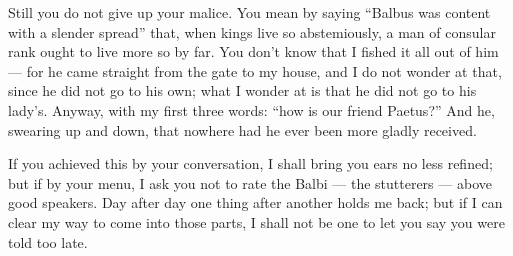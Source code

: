 

 Still you do not give up your malice. You mean by saying ``Balbus was content with a slender spread'' that, when kings live so abstemiously, a man of consular rank ought to live more so by far. You don't know that I fished it all out of him --- for he came straight from the gate to my house, and I do not wonder at that, since he did not go to his own; what I wonder at is that he did not go to his lady's. Anyway, with my first three words: ``how is our friend Paetus?'' And he, swearing up and down, that nowhere had he ever been more gladly received.

 If you achieved this by your conversation, I shall bring you ears no less refined; but if by your menu, I ask you not to rate the Balbi --- the stutterers --- above good speakers. Day after day one thing after another holds me back; but if I can clear my way to come into those parts, I shall not be one to let you say you were told too late.
